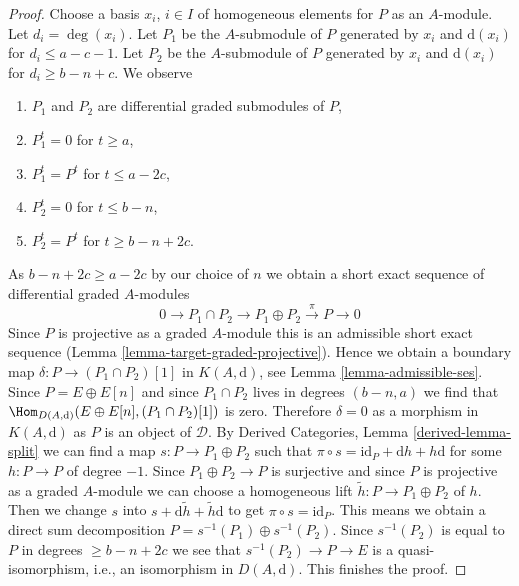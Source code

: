 \begin{proof}
\medskip\noindent
Choose a basis $x_i$, $i \in I$ of homogeneous elements for $P$ as an
$A$-module. Let $d_i = \deg(x_i)$.
Let $P_1$ be the $A$-submodule of $P$ generated by $x_i$ and
$\text{d}(x_i)$ for $d_i \leq a - c - 1$.
Let $P_2$ be the $A$-submodule of $P$ generated by $x_i$ and
$\text{d}(x_i)$ for $d_i \geq b - n + c$.
We observe
\begin{enumerate}
\item $P_1$ and $P_2$ are differential graded submodules of $P$,
\item $P_1^t = 0$ for $t \geq a$,
\item $P_1^t = P^t$ for $t \leq a - 2c$,
\item $P_2^t = 0$ for $t \leq b - n$,
\item $P_2^t = P^t$ for $t \geq b - n + 2c$.
\end{enumerate}
As $b - n + 2c \geq a - 2c$ by our choice of $n$
we obtain a short exact sequence of differential graded $A$-modules
$$
0 \to P_1 \cap P_2 \to P_1 \oplus P_2 \xrightarrow{\pi} P \to 0
$$
Since $P$ is projective as a graded $A$-module this is an admissible
short exact sequence (Lemma \ref{lemma-target-graded-projective}).
Hence we obtain a boundary map
$\delta : P \to (P_1 \cap P_2)[1]$ in $K(A, \text{d})$, see
Lemma \ref{lemma-admissible-ses}.
Since $P = E \oplus E[n]$ and since $P_1 \cap P_2$ lives in
degrees $(b - n, a)$ we find that
$\Hom_{D(A, \text{d})}(E \oplus E[n], (P_1 \cap P_2)[1])$ is
zero. Therefore $\delta = 0$ as a morphism in $K(A, \text{d})$
as $P$ is an object of $\mathcal{D}$.
By Derived Categories, Lemma \ref{derived-lemma-split}
we can find a map $s : P \to P_1 \oplus P_2$ such that
$\pi \circ s = \text{id}_P + \text{d}h + h\text{d}$ for some $h : P \to P$
of degree $-1$. Since $P_1 \oplus P_2 \to P$ is surjective and since $P$
is projective as a graded $A$-module we can choose a homogeneous
lift $\tilde h : P \to P_1 \oplus P_2$ of $h$. Then we change
$s$ into $s + \text{d} \tilde h + \tilde h \text{d}$ to get
$\pi \circ s = \text{id}_P$. This means we obtain a direct
sum decomposition $P = s^{-1}(P_1) \oplus s^{-1}(P_2)$.
Since $s^{-1}(P_2)$ is equal to $P$ in degrees $\geq b - n + 2c$
we see that $s^{-1}(P_2) \to P \to E$ is a quasi-isomorphism,
i.e., an isomorphism in $D(A, \text{d})$. This finishes the proof.
\end{proof}
